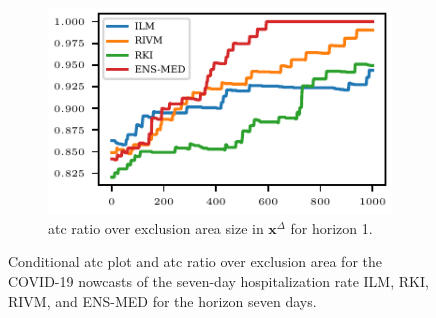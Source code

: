\documentclass[pdflatex]{sn-jnl}
\theoremstyle{plain}%
\theoremstyle{definition}
\newcommand{\diffx}{\mathbf{x}^{\Delta}}
\begin{document}
\begin{figure}
\begin{subfigure}[t]{.48\textwidth}
    \end{subfigure}\hfill
    \begin{subfigure}[t]{.48\textwidth}
    \includegraphics{plots/covid_nowcast/40_acc_eps_lag_14}
    \caption{\ac{atc} ratio over exclusion area size in $\diffx$ for horizon 1.}\label{fig:app-covid-atc-ratio-14}
    \end{subfigure}
    \caption[Conditional ATC plot and ATC ratio over exclusion area in COVID-19 nowcasting.]{Conditional \ac{atc} plot and \ac{atc} ratio over exclusion area for the COVID-19 nowcasts of the seven-day hospitalization rate ILM, RKI, RIVM, and ENS-MED for the horizon seven days.}
    \label{fig:app-covid-cond-prob-atc-ratio-1-14}
\end{figure}
\end{document}
